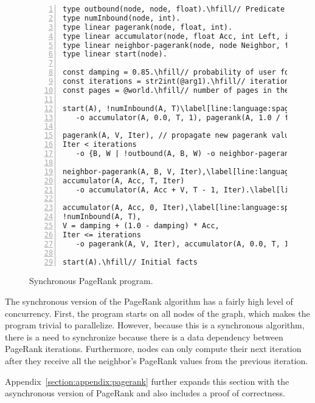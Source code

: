 \begin{figure}[h!]
\begin{Verbatim}[numbers=left,fontsize=\codesize,commandchars=\\\[\]]
type outbound(node, node, float).\hfill// Predicate declaration
type numInbound(node, int).
type linear pagerank(node, float, int).
type linear accumulator(node, float Acc, int Left, int Iteration).
type linear neighbor-pagerank(node, node Neighbor, float Rank, int Iteration).
type linear start(node).

const damping = 0.85.\hfill// probability of user following a link in the current page\label[line:language:spagerank_const1]
const iterations = str2int(@arg1).\hfill// iterations to compute
const pages = @world.\hfill// number of pages in the graph.\label[line:language:spagerank_const2]

start(A), !numInbound(A, T)\label[line:language:spagerank_first1]\hfill// Rule 1: initialize pagerank and accumulator
   -o accumulator(A, 0.0, T, 1), pagerank(A, 1.0 / float(pages), 0).\label[line:language:spagerank_first2]

pagerank(A, V, Iter), // propagate new pagerank value\label[line:language:spagerank_second1]\hfill// Rule 2: propagate pagerank
Iter < iterations
   -o {B, W | !outbound(A, B, W) -o neighbor-pagerank(B, A, V * W, Iter + 1)}.\label[line:language:spagerank_second2]

neighbor-pagerank(A, B, V, Iter),\label[line:language:spagerank_fourth1]\hfill// Rule 3: accumulate neighbor's value
accumulator(A, Acc, T, Iter)
   -o accumulator(A, Acc + V, T - 1, Iter).\label[line:language:spagerank_fourth2]

accumulator(A, Acc, 0, Iter),\label[line:language:spagerank_third1]\hfill// Rule 4: generate new pagerank
!numInbound(A, T),
V = damping + (1.0 - damping) * Acc,
Iter <= iterations
   -o pagerank(A, V, Iter), accumulator(A, 0.0, T, Iter + 1).\label[line:language:spagerank_third2]
	
start(A).\hfill// Initial facts
\end{Verbatim}
\caption{Synchronous PageRank program.}
\label{language:code:pagerank}
\end{figure}

The synchronous version of the PageRank algorithm has a fairly high level of
concurrency. First, the program starts on all nodes of the graph, which makes
the program trivial to parallelize. However, because this is a synchronous
algorithm, there is a need to synchronize because there is a data dependency
between PageRank iterations. Furthermore, nodes can only compute their next
iteration after they receive all the neighbor's PageRank values from the
previous iteration.

Appendix~\ref{section:appendix:pagerank} further expands this section with the
asynchronous version of PageRank and also includes a proof of correctness.
